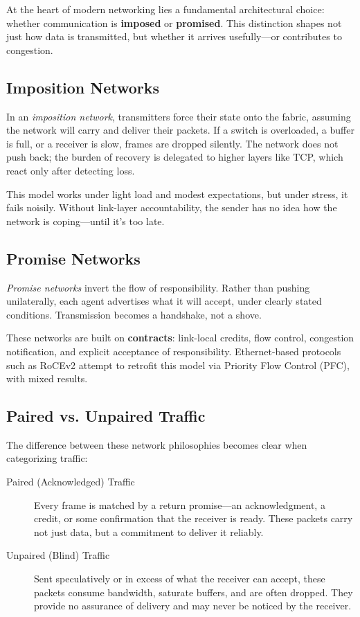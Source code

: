\documentclass[../OAE-SPEC-MAIN.tex]{subfiles}
\begin{document}
At the heart of modern networking lies a fundamental architectural choice: whether communication is \textbf{imposed} or \textbf{promised}. This distinction shapes not just how data is transmitted, but whether it arrives usefully—or contributes to congestion.

\subsection*{Imposition Networks}

In an \emph{imposition network}, transmitters force their state onto the fabric, assuming the network will carry and deliver their packets. If a switch is overloaded, a buffer is full, or a receiver is slow, frames are dropped silently. The network does not push back; the burden of recovery is delegated to higher layers like TCP, which react only after detecting loss.

This model works under light load and modest expectations, but under stress, it fails noisily. Without link-layer accountability, the sender has no idea how the network is coping—until it’s too late.

\subsection*{Promise Networks}

\emph{Promise networks} invert the flow of responsibility. Rather than pushing unilaterally, each agent advertises what it will accept, under clearly stated conditions. Transmission becomes a handshake, not a shove.

These networks are built on \textbf{contracts}: link-local credits, flow control, congestion notification, and explicit acceptance of responsibility. Ethernet-based protocols such as RoCEv2 attempt to retrofit this model via Priority Flow Control (PFC), with mixed results.

\subsection*{Paired vs. Unpaired Traffic}

The difference between these network philosophies becomes clear when categorizing traffic:

\begin{description}
  \item[Paired (Acknowledged) Traffic] Every frame is matched by a return promise—an acknowledgment, a credit, or some confirmation that the receiver is ready. These packets carry not just data, but a commitment to deliver it reliably.
  \item[Unpaired (Blind) Traffic] Sent speculatively or in excess of what the receiver can accept, these packets consume bandwidth, saturate buffers, and are often dropped. They provide no assurance of delivery and may never be noticed by the receiver.
\end{description}
\end{document}
